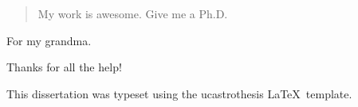 \documentclass[12pt]{myucthesis}
\begin{document}
\ssp %

\maketitle
\copyrightpage

\begin{abstract}
My work is awesome. Give me a Ph.D.
\end{abstract}

\begin{frontmatter}

\begin{dedication}
\null\vfil
{\large
\begin{center}
For my grandma.
\end{center}}
\null\vfil
\end{dedication}

\tableofcontents
\listoffigures %
\listoftables %


\begin{acknowledgements}
Thanks for all the help!

This dissertation was typeset using the
\textsf{ucastrothesis}
\LaTeX\ template.

\end{acknowledgements}
\end{frontmatter}








\appendix



{}
\end{document}
